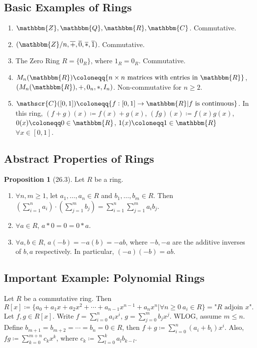 \documentclass{article}
\newcommand{\Z}{\mathbbm{Z}}
\newcommand{\Q}{\mathbbm{Q}}
\newcommand{\R}{\mathbbm{R}}
\newcommand{\C}{\mathbbm{C}}
\newcommand{\coleq}{\coloneqq}
\newcommand{\script}[1]{\mathscr{#1}}
\newcommand{\func}[3]{#1: #2 \to #3}
\theoremstyle{definition}
\newtheorem*{prop}{Proposition}
\theoremstyle{remark}
\begin{document}
{        \subsection*{Basic Examples of Rings}{
            \begin{enumerate}
                \item $\Z,\Q,\R,\C$. Commutative.
                \item $(\Z/n,\overline{+},\overline{0},\overline{*},\overline{1})$. Commutative.
                \item The Zero Ring $R=\{0_R\}$, where $1_R=0_R$. Commutative.
                \item $M_n(\R)\coleq \{n\times n\text{ matrices with entries in }\R\}$, $(M_n(\R),+,0_n,*,I_n)$. Non-commutative for $n\geq 2$.
                \item $\script{C}([0,1])\coleq \{\func{f}{[0,1]}{\R}|f\text{ is continuous}\}$. In this ring, $(f+g)(x)\coleq f(x)+g(x)$, $(fg)(x)\coleq f(x)g(x)$, $0(x)\coleq 0 \in \R$, $1(x) \coleq 1 \in \R$ $\forall x \in [0,1]$.
            \end{enumerate}
        }
        \subsection*{Abstract Properties of Rings}{
            \begin{prop}[26.3]
                Let $R$ be a ring.
                \begin{enumerate}
                    \item $\forall n,m \geq 1$, let $a_1,\ldots,a_n \in R$ and $b_1,\ldots, b_m \in R$. Then $\left(\sum_{i=1}^n a_i\right)\cdot\left(\sum_{j=1}^m b_j\right)=\sum_{i=1}^n\sum_{j=1}^m a_i b_j$.
                    \item $\forall a\in R$, $a*0=0=0*a$.
                    \item $\forall a,b\in R$, $a(-b)=-a(b)=-ab$, where $-b,-a$ are the additive inverses of $b,a$ respectively. In particular, $(-a)(-b)=ab$.
                \end{enumerate}
            \end{prop}
        }
        \subsection*{Important Example: Polynomial Rings}{
            Let $R$ be a commutative ring. Then
            \[R[x]\coleq\{a_0+a_1x+a_2x^2+\cdots+a_{n-1}x^{n-1}+a_nx^n|\forall n\geq 0 \ a_i \in R\}=\text{"}R\text{ adjoin }x\text{"}.\]
        Let $f,g\in R[x]$. Write $f=\sum_{i=0}^n a_i x^i$, $g=\sum_{j=0}^m b_j x^j$. WLOG, assume $m\leq n$. Define $b_{m+1}=b_{m+2}=\cdots=b_n=0 \in R$, then $f+g\coleq \sum_{i=0}^n (a_i+b_i)x^i$. Also, $fg \coleq \sum_{k=0}^{m+n} c_k x^k$, where $c_k\coleq \sum_{l=0}^k a_lb_{k-l}$. 
        }
    }
    
\end{document}
